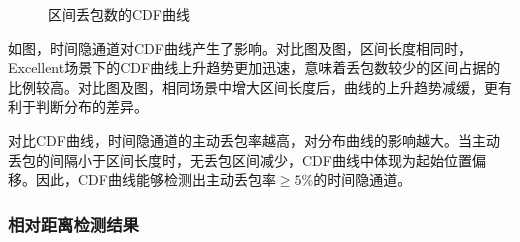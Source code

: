 {\begin{figure}[htbp]
{        }
        \caption{区间丢包数的CDF曲线}
        \label{fig:3:result:win:cdf}
	\end{figure}
}

如图，时间隐通道对CDF曲线产生了影响。对比图及图，区间长度相同时，Excellent场景下的CDF曲线上升趋势更加迅速，意味着丢包数较少的区间占据的比例较高。对比图及图，相同场景中增大区间长度后，曲线的上升趋势减缓，更有利于判断分布的差异。

对比CDF曲线，时间隐通道的主动丢包率越高，对分布曲线的影响越大。当主动丢包的间隔小于区间长度时，无丢包区间减少，CDF曲线中体现为起始位置偏移。因此，CDF曲线能够检测出主动丢包率$\ge 5\%$的时间隐通道。

\subsubsection{相对距离检测结果}
\label{chap:analyze:result:window:distance}

